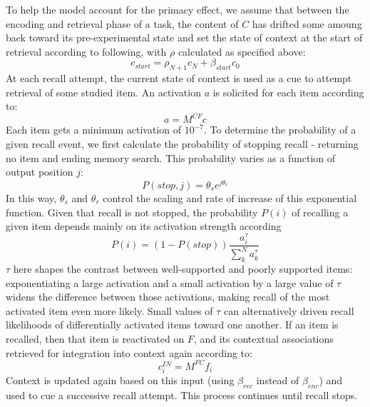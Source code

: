 {}\markdownRendererInterblockSeparator
{}To help the model account for the primacy effect, we assume that between the encoding and retrieval phase of a task, the content of $C$ has drifted some amoung back toward its pre-experimental state and set the state of context at the start of retrieval according to following, with $\rho$ calculated as specified above:\markdownRendererInterblockSeparator
{}\begin{equation} \label{eq:9} c_{start} = \rho_{N+1}c_N + \beta_{start}c_0 \end{equation}\markdownRendererInterblockSeparator
{}At each recall attempt, the current state of context is used as a cue to attempt retrieval of some studied item. An activation $a$ is solicited for each item according to:\markdownRendererInterblockSeparator
{}\begin{equation} \label{eq:10} a = M^{CF}c \end{equation}\markdownRendererInterblockSeparator
{}Each item gets a minimum activation of $10^{-7}$. To determine the probability of a given recall event, we first calculate the probability of stopping recall - returning no item and ending memory search. This probability varies as a function of output position $j$:\markdownRendererInterblockSeparator
{}\begin{equation} \label{eq:11} P(stop, j) = \theta_se^{j\theta_r} \end{equation}\markdownRendererInterblockSeparator
{}In this way, $\theta_s$ and $\theta_r$ control the scaling and rate of increase of this exponential function. Given that recall is not stopped, the probability $P(i)$ of recalling a given item depends mainly on its activation strength according\markdownRendererInterblockSeparator
{}\begin{equation} \label{eq:12} P(i) = (1-P(stop))\frac{a^{\tau}_i}{\sum_{k}^{N}a^{\tau}_k} \end{equation}\markdownRendererInterblockSeparator
{}$\tau$ here shapes the contrast between well-supported and poorly supported items: exponentiating a large activation and a small activation by a large value of $\tau$ widens the difference between those activations, making recall of the most activated item even more likely. Small values of $\tau$ can alternatively driven recall likelihoods of differentially activated items toward one another.\markdownRendererInterblockSeparator
{}If an item is recalled, then that item is reactivated on $F$, and its contextual associations retrieved for integration into context again according to:\markdownRendererInterblockSeparator
{}\begin{equation} \label{eq:13} c^{IN}_{i} = M^{FC}f_{i} \end{equation}\markdownRendererInterblockSeparator
{}Context is updated again based on this input (using $\beta_{rec}$ instead of $\beta_{enc}$) and used to cue a successive recall attempt. This process continues until recall stops.\relax